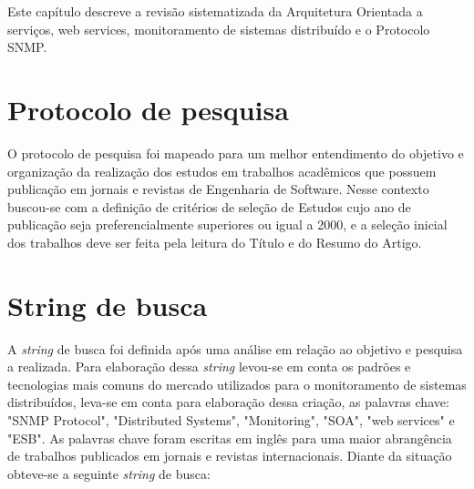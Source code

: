 \label{mapeamento_sistematico}

Este capítulo descreve a revisão sistematizada da Arquitetura Orientada a serviços, web services, monitoramento de sistemas distribuído e o Protocolo SNMP.



\section{Protocolo de pesquisa}%

O protocolo de pesquisa foi mapeado para um melhor entendimento do objetivo e organização da realização dos estudos em trabalhos acadêmicos que possuem publicação em jornais e revistas de Engenharia de Software. Nesse contexto buscou-se com a definição de critérios de seleção de Estudos cujo ano de publicação seja  preferencialmente superiores ou igual a 2000, e a seleção inicial dos trabalhos deve ser feita pela leitura do Título e do Resumo do Artigo. 

\section{String de busca}

A \textit{string} de busca foi definida após uma análise em relação ao objetivo e pesquisa a realizada. Para elaboração dessa \textit{string} levou-se em conta os padrões e tecnologias mais comuns do mercado utilizados para o monitoramento de sistemas distribuídos, leva-se em conta para elaboração dessa criação, as palavras chave: "SNMP Protocol", "Distributed Systems", "Monitoring", "\acrshort{SOA}", "web services" e "ESB". As palavras chave foram escritas em inglês para uma maior abrangência de trabalhos publicados em jornais e revistas internacionais. Diante da situação obteve-se a seguinte \textit{string} de busca:

